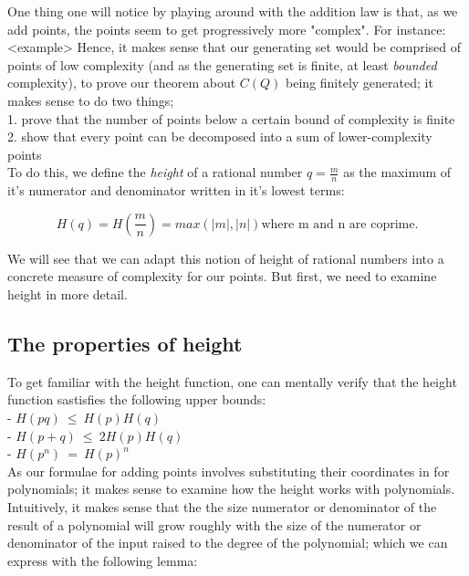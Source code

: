 \documentclass{article}
\begin{document}
One thing one will notice by playing around with the addition law is that, as we add points, the points seem to get progressively more "complex". For instance: <example>
Hence, it makes sense that our generating set would be comprised of points of low complexity (and as the generating set is finite, at least \emph{bounded} complexity), to prove our theorem about $C(Q)$ being finitely generated; it makes sense to do two things;\\

1. prove that the number of points below a certain bound of complexity is finite \\

2. show that every point can be decomposed into a sum of lower-complexity points \\

To do this, we define the \emph{height} of a rational number $q = \frac{m}{n}$ as the maximum of it's numerator and denominator written in it's lowest terms:

\[ H(q) = H(\frac{m}{n}) = max(|m|, |n|) \text{where m and n are coprime.} \]

We will see that we can adapt this notion of height of rational numbers into a concrete measure of complexity for our points. But first, we need to examine height in more detail.

\subsection{The properties of height}

To get familiar with the height function, one can mentally verify that the height function sastisfies the following upper bounds:\\

- $ H(pq) \ \leq \ H(p)H(q) $\\

- $ H(p + q) \ \leq \ 2H(p)H(q) $\\

- $ H(p^n) \ = \ H(p)^n $ \\

As our formulae for adding points involves substituting their coordinates in for polynomials; it makes sense to examine how the height works with polynomials. Intuitively, it makes sense that the the size numerator or denominator of the result of a polynomial will grow roughly with the size of the numerator or denominator of the input raised to the degree of the polynomial; which we can express with the following lemma:\\
\end{document}
